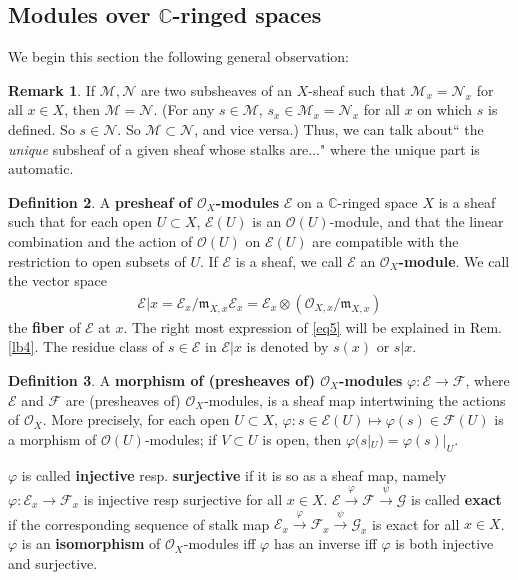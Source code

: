 \documentclass[12pt,b5paper,notitlepage]{report}
\theoremstyle{definition}
\newtheorem{df}{Definition}[section]
\newtheorem{rem}[df]{Remark}
\theoremstyle{plain}
\newcommand{\fk}{\mathfrak}
\newcommand{\scr}{\mathscr}
\newcommand{\Cbb}{\mathbb C}
\numberwithin{equation}{section}
\begin{document}
\subsection{Modules over $\Cbb$-ringed spaces}

We begin this section the following general observation:
\begin{rem}\label{lb11}
If $\scr M,\scr N$ are two subsheaves of an $X$-sheaf such that $\scr M_x=\scr N_x$ for all $x\in X$, then $\scr M=\scr N$. (For any $s\in \scr M$, $s_x\in\scr M_x=\scr N_x$ for all $x$ on which $s$ is defined. So $s\in\scr N$. So $\scr M\subset\scr N$, and vice versa.) Thus, we can talk about`` the \emph{unique} subsheaf of a given sheaf whose stalks are..." where the unique part is automatic. 
\end{rem}

\begin{df}
A \textbf{presheaf of $\scr O_X$-modules} $\scr E$ on a $\Cbb$-ringed space $X$ is a sheaf such that for each open $U\subset X$, $\scr E(U)$ is an $\scr O(U)$-module, and that the linear combination and the action of $\scr O(U)$ on $\scr E(U)$ are compatible with the restriction to open subsets of $U$. If $\scr E$ is a sheaf, we call $\scr E$ an \textbf{$\scr O_X$-module}. We call the vector space \index{00@Fiber $\scr E\lvert x=\scr E_x/{\fk m_{X,x}\scr E_x}=\scr E_x\otimes(\scr O_{X,x}/\fk m_{X,x})$}
\begin{align}
\scr E|x=\scr E_x/{\fk m_{X,x}\scr E_x}=\scr E_x\otimes(\scr O_{X,x}/\fk m_{X,x})\label{eq5}
\end{align}
the \textbf{fiber} of $\scr E$ at $x$. The right most expression of \eqref{eq5} will be explained in Rem. \ref{lb4}. The residue class of $s\in \scr E$ in $\scr E|x$ is denoted by $s(x)$ or $s|x$. 
\end{df}

\begin{df}
A \textbf{morphism of (presheaves of) $\scr O_X$-modules} $\varphi:\scr E\rightarrow\scr F$, where $\scr E$ and $\scr F$ are (presheaves of) $\scr O_X$-modules, is a sheaf map intertwining the actions of $\scr O_X$. More precisely, for each open $U\subset X$, $\varphi:s\in\scr E(U)\mapsto \varphi(s)\in\scr F(U)$ is a morphism of $\scr O(U)$-modules; if $V\subset U$ is open, then $\varphi(s|_U)=\varphi(s)|_U$. 

$\varphi$ is called \textbf{injective} resp. \textbf{surjective} if it is so as a sheaf map, namely $\varphi:\scr E_x\rightarrow\scr F_x$ is injective resp surjective for all $x\in X$. $\scr E\xrightarrow{\varphi}\scr F\xrightarrow{\psi}\scr G$ is called \textbf{exact} if the corresponding sequence of stalk map $\scr E_x\xrightarrow{\varphi}\scr F_x\xrightarrow{\psi}\scr G_x$ is exact for all $x\in X$. $\varphi$ is an \textbf{isomorphism} of $\scr O_X$-modules iff $\varphi$ has an inverse iff $\varphi$ is both injective and surjective. \hfill\qedsymbol
\end{df}
\end{document}
